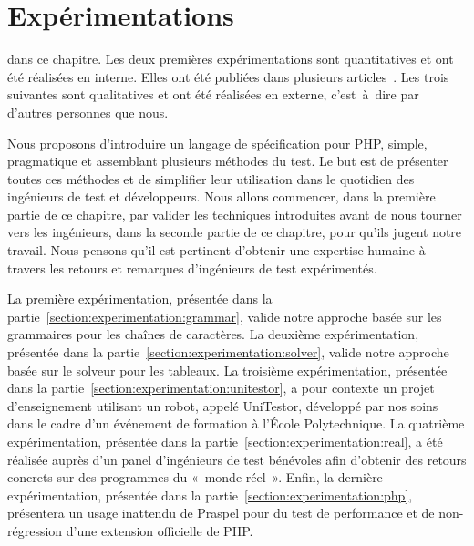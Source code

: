 \chapter{Expérimentations}
\label{chapter:experimentations}

\mminitoc

 dans ce chapitre. Les deux premières expérimentations sont
{\strong quantitatives} et ont été réalisées en interne. Elles ont été publiées
dans plusieurs articles~. Les
trois suivantes sont {\strong qualitatives} et ont été réalisées en externe,
c'est~à~dire par d'autres personnes que nous.

Nous proposons d'introduire un langage de spécification pour PHP, simple,
pragmatique et assemblant plusieurs méthodes du test. Le but est de présenter
toutes ces méthodes et de simplifier leur utilisation dans le quotidien des
ingénieurs de test et développeurs. Nous allons commencer, dans la première
partie de ce chapitre, par valider les techniques introduites avant de nous
tourner vers les ingénieurs, dans la seconde partie de ce chapitre, pour qu'ils
jugent notre travail. Nous pensons qu'il est pertinent d'obtenir une expertise
humaine à travers les retours et remarques d'ingénieurs de test expérimentés.

La première expérimentation, présentée dans la
partie~\ref{section:experimentation:grammar}, valide notre approche basée sur
les grammaires pour les chaînes de caractères. La deuxième expérimentation,
présentée dans la partie~\ref{section:experimentation:solver}, valide notre
approche basée sur le solveur pour les tableaux. La troisième expérimentation,
présentée dans la partie~\ref{section:experimentation:unitestor}, a pour
contexte un projet d'enseignement utilisant un robot, appelé UniTestor,
développé par nos soins dans le cadre d'un événement de formation à l'École
Polytechnique. La quatrième expérimentation, présentée dans la
partie~\ref{section:experimentation:real}, a été réalisée auprès d'un panel
d'ingénieurs de test bénévoles afin d'obtenir des retours concrets sur des
programmes du «~monde réel~». Enfin, la dernière expérimentation, présentée dans
la partie~\ref{section:experimentation:php}, présentera un usage inattendu de
Praspel pour du test de performance et de non-régression d'une extension
officielle de PHP.

